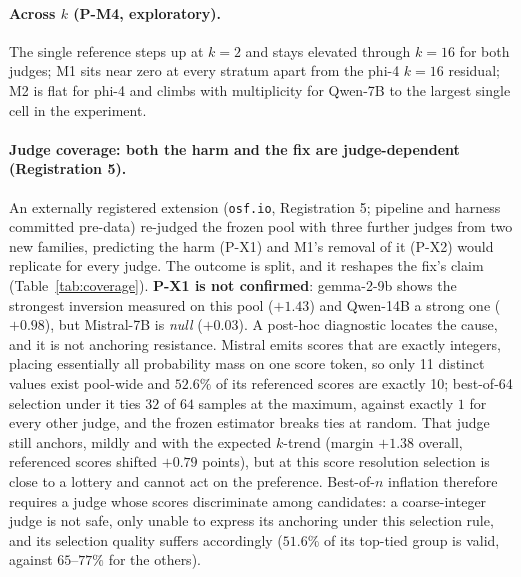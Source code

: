 \documentclass[11pt]{article}
\begin{document}
\paragraph{Across $k$ (P-M4, exploratory).}
The single reference steps up at $k{=}2$ and stays elevated through $k{=}16$ for both judges; M1 sits near zero at every stratum apart from the phi-4 $k{=}16$ residual; M2 is flat for phi-4 and climbs with multiplicity for Qwen-7B to the largest single cell in the experiment.

\paragraph{Judge coverage: both the harm and the fix are judge-dependent (Registration 5).}
An externally registered extension (\texttt{osf.io}, Registration 5; pipeline and harness committed pre-data) re-judged the frozen pool with three further judges from two new families, predicting the harm (P-X1) and M1's removal of it (P-X2) would replicate for every judge.
The outcome is split, and it reshapes the fix's claim (Table~\ref{tab:coverage}).
\textbf{P-X1 is not confirmed}: gemma-2-9b shows the strongest inversion measured on this pool ($+1.43$) and Qwen-14B a strong one ($+0.98$), but Mistral-7B is \emph{null} ($+0.03$).
A post-hoc diagnostic locates the cause, and it is not anchoring resistance.
Mistral emits scores that are exactly integers, placing essentially all probability mass on one score token, so only 11 distinct values exist pool-wide and $52.6\%$ of its referenced scores are exactly 10; best-of-64 selection under it ties $32$ of $64$ samples at the maximum, against exactly $1$ for every other judge, and the frozen estimator breaks ties at random.
That judge still anchors, mildly and with the expected $k$-trend (margin $+1.38$ overall, referenced scores shifted $+0.79$ points), but at this score resolution selection is close to a lottery and cannot act on the preference.
Best-of-$n$ inflation therefore requires a judge whose scores discriminate among candidates: a coarse-integer judge is not safe, only unable to express its anchoring under this selection rule, and its selection quality suffers accordingly ($51.6\%$ of its top-tied group is valid, against $65$--$77\%$ for the others).
\end{document}
